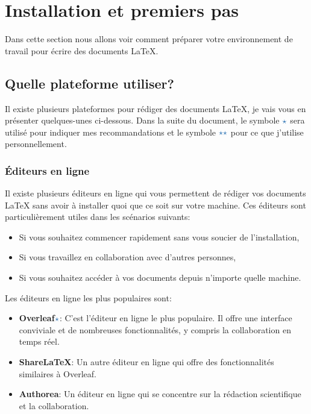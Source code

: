 \section{Installation et premiers pas}\label{sec:installation}
Dans cette section nous allons voir comment préparer
votre environnement de travail pour écrire des documents LaTeX.

\subsection{Quelle plateforme utiliser?}\label{subsec:platform_choice}
Il existe plusieurs plateformes pour rédiger des documents LaTeX, je vais vous 
en présenter quelques-unes ci-dessous. Dans la suite du document, 
le symbole \(\color{astral}\star\) sera utilisé pour indiquer mes recommandations
et le symbole \(\color{astral}\star\star\) pour ce que j'utilise personnellement.

\subsubsection{Éditeurs en ligne}\label{subsubsec:online_editors}

Il existe plusieurs éditeurs en ligne qui vous permettent de rédiger vos documents LaTeX sans avoir à installer quoi que ce soit sur votre machine.
Ces éditeurs sont particulièrement utiles dans les scénarios suivants:
\begin{itemize}
    \item Si vous souhaitez commencer rapidement sans vous soucier de l'installation,
    \item Si vous travaillez en collaboration avec d'autres personnes,
    \item Si vous souhaitez accéder à vos documents depuis n'importe quelle machine.
\end{itemize}

Les éditeurs en ligne les plus populaires sont:
\begin{itemize}
    \item \textbf{Overleaf}\(\color{astral}\star\): C'est l'éditeur en ligne le plus populaire.
    Il offre une interface conviviale et de nombreuses fonctionnalités, y compris la collaboration en temps réel.

    \item \textbf{ShareLaTeX}: Un autre éditeur en ligne qui offre des fonctionnalités similaires à Overleaf.
    \item \textbf{Authorea}: Un éditeur en ligne qui se concentre sur la rédaction scientifique et la collaboration.
\end{itemize}


